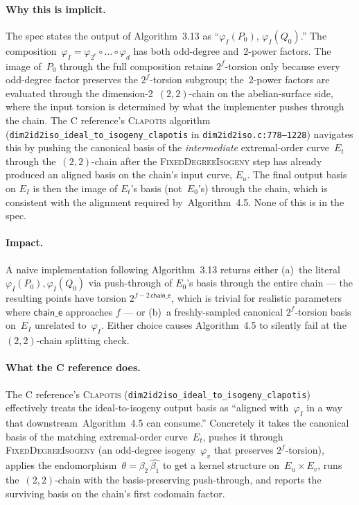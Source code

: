 \documentclass[a4paper,11pt]{article}
\newcommand{\algo}[1]{Algorithm~#1}
\begin{document}
\paragraph{Why this is implicit.}
The spec states the output of \algo{3.13} as ``$\varphi_I(P_0)$,
$\varphi_I(Q_0)$.'' The composition~$\varphi_I = \varphi_{2^e} \circ
\dots \circ \varphi_d$ has both odd-degree and~$2$-power factors.
The image of~$P_0$ through the full composition retains
$2^f$-torsion only because every odd-degree factor preserves the
$2^f$-torsion subgroup; the~$2$-power factors are evaluated
through the dimension-2~$(2,2)$-chain on the abelian-surface
side, where the input torsion is determined by what the
implementer pushes through the chain.  The C reference's
\textsc{Clapotis} algorithm
(\texttt{dim2id2iso\_ideal\_to\_isogeny\_clapotis} in
\texttt{dim2id2iso.c:778--1228}) navigates this by pushing the
canonical basis of the \emph{intermediate} extremal-order
curve~$E_t$ through the~$(2,2)$-chain after the
\textsc{FixedDegreeIsogeny} step has already produced an aligned
basis on the chain's input curve, $E_u$.  The final output basis
on $E_I$ is then the image of $E_t$'s basis (not~$E_0$'s) through
the chain, which is consistent with the alignment required
by~\algo{4.5}.  None of this is in the spec.

\paragraph{Impact.}
A naive implementation following \algo{3.13} returns either
(a)~the literal $\varphi_I(P_0), \varphi_I(Q_0)$ via push-through
of $E_0$'s basis through the entire chain --- the resulting points
have torsion $2^{f - 2\,\mathsf{chain\_e}}$, which is trivial for
realistic parameters where $\mathsf{chain\_e}$ approaches $f$ ---
or (b)~a freshly-sampled canonical $2^f$-torsion basis on~$E_I$
unrelated to~$\varphi_I$.  Either choice causes \algo{4.5} to
silently fail at the~$(2,2)$-chain splitting check.

\paragraph{What the C reference does.}
The C reference's \textsc{Clapotis}
(\texttt{dim2id2iso\_ideal\_to\_isogeny\_clapotis}) effectively
treats the ideal-to-isogeny output basis as ``aligned with~$\varphi_I$
in a way that downstream~\algo{4.5} can consume.''  Concretely it
takes the canonical basis of the matching extremal-order
curve~$E_t$, pushes it through \textsc{FixedDegreeIsogeny} (an
odd-degree isogeny~$\varphi_v$ that preserves $2^f$-torsion),
applies the endomorphism~$\theta = \beta_2\,\widehat{\beta_1}$ to
get a kernel structure on~$E_u \times E_v$, runs the~$(2,2)$-chain
with the basis-preserving push-through, and reports the surviving
basis on the chain's first codomain factor.
\end{document}
